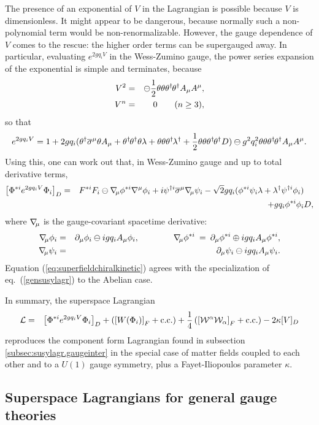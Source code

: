 \documentclass[12pt]{article}
\def\BDpos{}
\def\BDplus{+}
\def\BDminus{-}
\def\thetasigmamuthetadagger{\theta\sigma^\mu\theta^\dagger}
\def\BDpos{-}
\def\BDplus{-}
\def\BDminus{+}
\def\thetasigmamuthetadagger{\theta^\dagger\sigmabar^\mu\theta}
\def\BDpos{\oplus}
\def\BDplus{\oplus}
\def\BDminus{\ominus}
\def\thetasigmamuthetadagger{\theta\sigma^\mu\theta^\dagger}
\def\BDpos{\ominus}
\def\BDplus{\ominus}
\def\BDminus{\oplus}
\def\thetasigmamuthetadagger{\theta^\dagger\sigmabar^\mu\theta}
\newcommand{\thdthd}{\theta^\dagger\hspace{-1pt}\theta^\dagger}
\newcommand{\nablasubmu}{\nabla\hspace{-2pt}{}_\mu}
\def\beq{\begin{eqnarray}}
\def\eeq{\end{eqnarray}}
\def\sigmabar{\overline\sigma}
\begin{document}
The presence of an exponential of $V$ in the Lagrangian is possible 
because $V$ is dimensionless. It might appear to be dangerous, because 
normally such a non-polynomial term would be non-renormalizable. However, 
the gauge dependence of $V$ comes to the rescue: the higher order 
terms can be supergauged away. In particular, evaluating $e^{2 g q_i V}$ 
in the Wess-Zumino gauge, the power series expansion of the exponential 
is simple and terminates, because
\beq
V^2 &=& \BDpos\frac{1}{2} 
\theta\theta\thdthd A_\mu A^\mu,
\\
V^n &=& 0\qquad(n\geq 3),
\eeq
so that 
\beq
e^{2 g q_i V} = 1 + 2 g q_i (\thetasigmamuthetadagger  A_\mu + 
\thdthd \theta \lambda 
+ \theta\theta \theta^\dagger\hspace{-1pt} \lambda^\dagger +
\frac{1}{2} \theta\theta\thdthd D )
\BDplus g^2 q_i^2 \theta\theta\thdthd A_\mu A^\mu.
\eeq
Using this, one can work out that, in Wess-Zumino gauge and up to total 
derivative terms,
\beq
\left [ \Phi^{*i} e^{2 g q_i V} \Phi_i \right ]_D 
&=&
F^{*i} F_i 
\BDplus \nablasubmu \phi^{*i} \nabla^\mu \phi_i
+ i \psi^{\dagger i} \sigmabar^\mu \nablasubmu \psi_i
- \sqrt{2} g q_i 
( \phi^{*i} \psi_i \lambda + \lambda^\dagger \psi^{\dagger i} \phi_i)
\phantom{xx}
\nonumber \\ &&
+ g q_i  \phi^{*i} \phi_i D,
\label{eq:superfieldchiralkinetic}
\eeq 
where $\nablasubmu$ is the gauge-covariant spacetime derivative:
\beq
\nablasubmu \phi_i &=& \partial_\mu \phi_i \BDplus i g q_i A_\mu \phi_i,
\qquad\qquad
\nablasubmu \phi^{*i} \>=\> \partial_\mu \phi^{*i} \BDminus i g q_i A_\mu 
\phi^{*i},
\\
\nablasubmu \psi_i &=& \partial_\mu \psi_i \BDplus i g q_i A_\mu \psi_i .
\eeq
Equation (\ref{eq:superfieldchiralkinetic}) agrees with the 
specialization of eq.~(\ref{gensusylagr}) to the Abelian case.

In summary, the superspace Lagrangian
\beq
{\cal L} &=& 
 \left [ \Phi^{*i} e^{2 g q_i V} \Phi_i \right ]_D
+ \left (\left [W(\Phi_i)\right ]_F + {\rm c.c.} \right )
+
\frac{1}{4}\left (\left [{\cal W}^\alpha {\cal W}_\alpha \right ]_F 
+ {\rm c.c.} \right )
-2 \kappa [V]_D
\eeq
reproduces the component form Lagrangian found in 
subsection \ref{subsec:susylagr.gaugeinter}
in the special case of matter fields coupled to each other and to a 
$U(1)$ gauge symmetry, plus a Fayet-Iliopoulos parameter $\kappa$.

\subsection{Superspace Lagrangians for general 
gauge theories\label{subsec:superspacelagrnonabelian}}
\setcounter{equation}{0}
\setcounter{footnote}{2}
\end{document}
